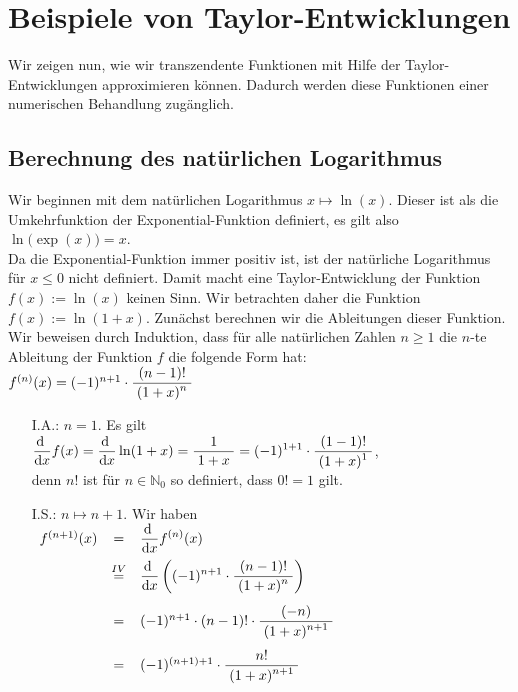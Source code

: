\section{Beispiele von Taylor-Entwicklungen}
Wir zeigen nun, wie wir transzendente Funktionen 
mit Hilfe der Taylor-Entwicklungen approximieren k\"onnen.  Dadurch werden diese Funktionen
einer numerischen Behandlung zug\"anglich.  

\subsection{Berechnung des nat\"urlichen Logarithmus}
Wir beginnen mit dem nat\"urlichen Logarithmus $x \mapsto \ln(x)$.  Dieser ist als die Umkehrfunktion der
Exponential-Funktion definiert, es gilt also
\\[0.2cm]
\hspace*{1.3cm}
$\ln\bigl(\exp(x)\bigr) = x$.
\\[0.2cm]
Da die Exponential-Funktion immer positiv ist, ist der nat\"urliche Logarithmus f\"ur $x \leq 0$  nicht
definiert.  Damit macht eine Taylor-Entwicklung der Funktion $f(x) := \ln(x)$ keinen Sinn. 
Wir betrachten daher die Funktion $f(x)  := \ln(1 + x)$.  Zun\"achst berechnen wir die
Ableitungen dieser Funktion.  Wir beweisen durch Induktion, dass f\"ur alle
nat\"urlichen Zahlen $n\geq 1$ die $n$-te Ableitung der Funktion $f$ die folgende Form hat:
\\[0.2cm]
\hspace*{1.3cm} $f^{(n)}(x) = (-1)^{n+1}\cdot \displaystyle\frac{\;\displaystyle(n-1)!\;}{\;\displaystyle(1+x)^n\;}$
\begin{enumerate}
\item[I.A.:] $n=1$.  Es gilt
  \\[0.2cm]
  \hspace*{1.3cm}
  $\displaystyle\frac{\textrm{d}\;}{\textrm{d}x} f(x) = \displaystyle\frac{\textrm{d}\;}{\textrm{d}x} \ln(1+x) = \displaystyle\frac{\;\displaystyle1\;}{\;\displaystyle1+x\;} = (-1)^{1+1}\cdot \displaystyle\frac{\;\displaystyle(1-1)!\;}{\;\displaystyle(1+x)^1\;}$,
  \\[0.2cm]
  denn $n!$ ist f\"ur $n\in\mathbb{N}_0$ so definiert, dass $0! = 1$ gilt.
\item[I.S.:] $n \mapsto n+1$.  Wir haben 
  \\[0.3cm]
  \hspace*{1.3cm}
  $
  \begin{array}[t]{lcl}  
    f^{(n+1)}(x) & = & \displaystyle\frac{\textrm{d}\;}{\textrm{d}x} f^{(n)}(x) \\[0.3cm]
    & \stackrel{IV}{=} & \displaystyle\frac{\textrm{d}\;}{\textrm{d}x} \left((-1)^{n+1}\cdot \displaystyle\frac{\;\displaystyle(n-1)!\;}{\;\displaystyle(1+x)^n\;}\right) \\[0.5cm]
    & = & (-1)^{n+1}\cdot (n-1)!\cdot \displaystyle\frac{\;\displaystyle(-n)\;}{\;\displaystyle(1+x)^{n+1}\;} \\[0.5cm]
    & = & (-1)^{(n+1)+1}\cdot \displaystyle\frac{\;\displaystyle n!\;}{\;\displaystyle(1+x)^{n+1}\;} \\[0.3cm]
  \end{array}
  $  
\end{enumerate}
